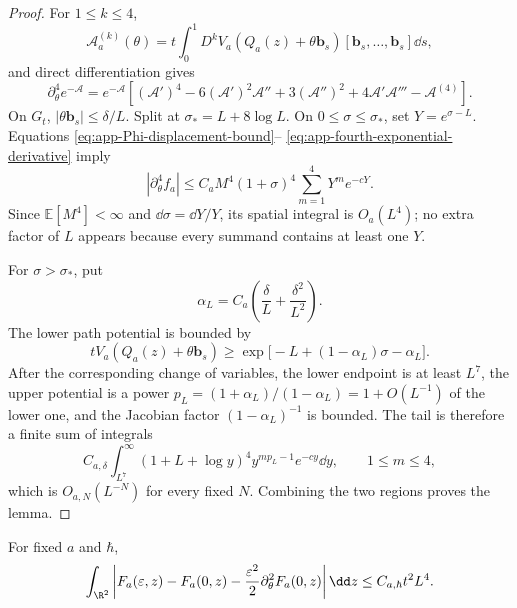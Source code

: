 \begin{proof}
For \(1\le k\le4\),
\begin{equation}
 \mathcal A_a^{(k)}(\theta)
 =t\int_0^1D^kV_a(Q_a(z)+\theta\mathbf b_s)
 [\mathbf b_s,\ldots,\mathbf b_s]\dd s,
\end{equation}
and direct differentiation gives
\begin{equation}
 \partial_\theta^4e^{-\mathcal A}
 =e^{-\mathcal A}\left[(\mathcal A')^4
 -6(\mathcal A')^2\mathcal A''+3(\mathcal A'')^2
 +4\mathcal A'\mathcal A'''-\mathcal A^{(4)}\right].
 \label{eq:app-fourth-exponential-derivative}
\end{equation}
On \(G_t\), \(|\theta\mathbf b_s|\le\delta/L\).  Split at
\(\sigma_*=L+8\log L\).  On \(0\le\sigma\le\sigma_*\), set
\(Y=e^{\sigma-L}\).  Equations
\eqref{eq:app-Phi-displacement-bound}--
\eqref{eq:app-fourth-exponential-derivative} imply
\begin{equation}
 |\partial_\theta^4f_a|
 \le C_aM^4(1+\sigma)^4
 \sum_{m=1}^4Y^me^{-cY}.
 \label{eq:app-fourth-main-bound}
\end{equation}
Since \(\mathbb E[M^4]<\infty\) and \(\dd\sigma=\dd Y/Y\), its spatial
integral is \(O_a(L^4)\); no extra factor of \(L\) appears because every
summand contains at least one \(Y\).

For \(\sigma>\sigma_*\), put
\begin{equation}
 \alpha_L=C_a\left(\frac\delta L+\frac{\delta^2}{L^2}\right).
\end{equation}
The lower path potential is bounded by
\begin{equation}
 tV_a(Q_a(z)+\theta\mathbf b_s)
 \ge \exp\bigl[-L+(1-\alpha_L)\sigma-\alpha_L\bigr].
\end{equation}
After the corresponding change of variables, the lower endpoint is at least
\(L^7\), the upper potential is a power
\(p_L=(1+\alpha_L)/(1-\alpha_L)=1+O(L^{-1})\) of the lower one, and the
Jacobian factor \((1-\alpha_L)^{-1}\) is bounded.  The tail is therefore a
finite sum of integrals
\begin{equation}
 C_{a,\delta}\int_{L^7}^{\infty}
 (1+L+\log y)^4y^{mp_L-1}e^{-cy}\dd y,
 \qquad1\le m\le4,
\end{equation}
which is \(O_{a,N}(L^{-N})\) for every fixed \(N\).  Combining the two
regions proves the lemma.
\end{proof}

\begin{lemma}
\label{lem:app-uniform-amplitude-expansion}
For fixed \(a\) and \(\hbar\),
\begin{equation}
 \int_{\R^2}\left|F_a(\varepsilon,z)-F_a(0,z)
 -\frac{\varepsilon^2}{2}\partial_\theta^2F_a(0,z)\right|\dd z
 \le C_{a,\hbar}t^2L^4.
 \label{eq:app-uniform-amplitude-expansion}
\end{equation}
\end{lemma}

